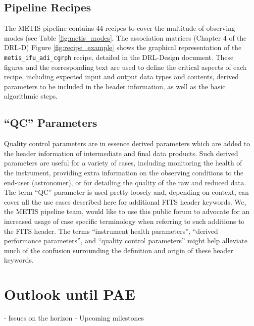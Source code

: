 \documentclass[a4paper]{spie}  %
\begin{document}
\subsection{Pipeline Recipes}

The METIS pipeline contains 44 recipes to cover the multitude of observing modes (see Table \ref{fig:metis_modes}. 
The association matrices (Chapter 4 of the DRL-D)
Figure \ref{fig:recipe_example} shows the graphical representation of the \verb|metis_ifu_adi_cgrph| recipe, detailed in the DRL-Design document\cite{DRLD}. 
These figures and the corresponding text are used to define the critical aspects of each recipe, including expected input and output data types and contents, derived parameters to be included in the header information, as well as the basic algorithmic steps.

\subsection{``QC'' Parameters}

Quality control parameters are in essence derived parameters which are added to the header information of intermediate and final data products. 
Such derived parameters are useful for a variety of cases, including monitoring the health of the instrument, providing extra information on the observing conditions to the end-user (astronomer), or for detailing the quality of the raw and reduced data.
The term ``QC'' parameter is used pretty loosely and, depending on context, can cover all the use cases described here for additional FITS header keywords. 
We, the METIS pipeline team, would like to use this public forum to advocate for an increased usage of case specific terminology when referring to such additions to the FITS header. 
The terms ``instrument health parameters'', ``derived performance parameters'', and ``quality control parameters'' might help alleviate much of the confusion surrounding the definition and origin of these header keywords.


\section{Outlook until PAE}
\label{sec:outlook}
- Issues on the horizon
- Upcoming milestones


\appendix    %

\acknowledgments %


\end{document}
